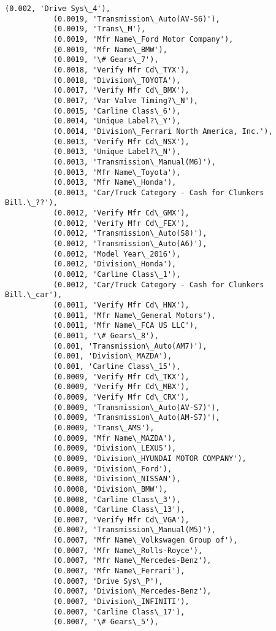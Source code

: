 \documentclass[11pt]{article}
\begin{document}
\begin{Verbatim}[commandchars=\\\{\}]
           (0.002, 'Drive Sys\_4'),
           (0.0019, 'Transmission\_Auto(AV-S6)'),
           (0.0019, 'Trans\_M'),
           (0.0019, 'Mfr Name\_Ford Motor Company'),
           (0.0019, 'Mfr Name\_BMW'),
           (0.0019, '\# Gears\_7'),
           (0.0018, 'Verify Mfr Cd\_TYX'),
           (0.0018, 'Division\_TOYOTA'),
           (0.0017, 'Verify Mfr Cd\_BMX'),
           (0.0017, 'Var Valve Timing?\_N'),
           (0.0015, 'Carline Class\_6'),
           (0.0014, 'Unique Label?\_Y'),
           (0.0014, 'Division\_Ferrari North America, Inc.'),
           (0.0013, 'Verify Mfr Cd\_NSX'),
           (0.0013, 'Unique Label?\_N'),
           (0.0013, 'Transmission\_Manual(M6)'),
           (0.0013, 'Mfr Name\_Toyota'),
           (0.0013, 'Mfr Name\_Honda'),
           (0.0013, 'Car/Truck Category - Cash for Clunkers Bill.\_??'),
           (0.0012, 'Verify Mfr Cd\_GMX'),
           (0.0012, 'Verify Mfr Cd\_FEX'),
           (0.0012, 'Transmission\_Auto(S8)'),
           (0.0012, 'Transmission\_Auto(A6)'),
           (0.0012, 'Model Year\_2016'),
           (0.0012, 'Division\_Honda'),
           (0.0012, 'Carline Class\_1'),
           (0.0012, 'Car/Truck Category - Cash for Clunkers Bill.\_car'),
           (0.0011, 'Verify Mfr Cd\_HNX'),
           (0.0011, 'Mfr Name\_General Motors'),
           (0.0011, 'Mfr Name\_FCA US LLC'),
           (0.0011, '\# Gears\_8'),
           (0.001, 'Transmission\_Auto(AM7)'),
           (0.001, 'Division\_MAZDA'),
           (0.001, 'Carline Class\_15'),
           (0.0009, 'Verify Mfr Cd\_TKX'),
           (0.0009, 'Verify Mfr Cd\_MBX'),
           (0.0009, 'Verify Mfr Cd\_CRX'),
           (0.0009, 'Transmission\_Auto(AV-S7)'),
           (0.0009, 'Transmission\_Auto(AM-S7)'),
           (0.0009, 'Trans\_AMS'),
           (0.0009, 'Mfr Name\_MAZDA'),
           (0.0009, 'Division\_LEXUS'),
           (0.0009, 'Division\_HYUNDAI MOTOR COMPANY'),
           (0.0009, 'Division\_Ford'),
           (0.0008, 'Division\_NISSAN'),
           (0.0008, 'Division\_BMW'),
           (0.0008, 'Carline Class\_3'),
           (0.0008, 'Carline Class\_13'),
           (0.0007, 'Verify Mfr Cd\_VGA'),
           (0.0007, 'Transmission\_Manual(M5)'),
           (0.0007, 'Mfr Name\_Volkswagen Group of'),
           (0.0007, 'Mfr Name\_Rolls-Royce'),
           (0.0007, 'Mfr Name\_Mercedes-Benz'),
           (0.0007, 'Mfr Name\_Ferrari'),
           (0.0007, 'Drive Sys\_P'),
           (0.0007, 'Division\_Mercedes-Benz'),
           (0.0007, 'Division\_INFINITI'),
           (0.0007, 'Carline Class\_17'),
           (0.0007, '\# Gears\_5'),

\end{Verbatim}
\end{document}
